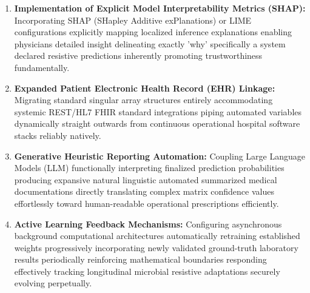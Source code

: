 \documentclass[12pt,a4paper]{report}
\begin{document}
\begin{enumerate}[leftmargin=*]
  \item \textbf{Implementation of Explicit Model Interpretability Metrics (SHAP):}
  Incorporating SHAP (SHapley Additive exPlanations) or LIME configurations explicitly mapping localized inference explanations enabling physicians detailed insight delineating exactly 'why' specifically a system declared resistive predictions inherently promoting trustworthiness fundamentally.

  \item \textbf{Expanded Patient Electronic Health Record (EHR) Linkage:}
  Migrating standard singular array structures entirely accommodating systemic REST/HL7 FHIR standard integrations piping automated variables dynamically straight outwards from continuous operational hospital software stacks reliably natively.

  \item \textbf{Generative Heuristic Reporting Automation:}
  Coupling Large Language Models (LLM) functionally interpreting finalized prediction probabilities producing expansive natural linguistic automated summarized medical documentations directly translating complex matrix confidence values effortlessly toward human-readable operational prescriptions efficiently.

  \item \textbf{Active Learning Feedback Mechanisms:}
  Configuring asynchronous background computational architectures automatically retraining established weights progressively incorporating newly validated ground-truth laboratory results periodically reinforcing mathematical boundaries responding effectively tracking longitudinal microbial resistive adaptations securely evolving perpetually.
\end{enumerate}

{}
\thispagestyle{fancy}
\end{document}
